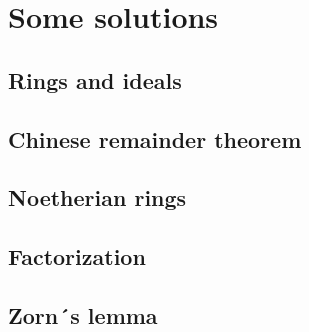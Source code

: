 \chapter{Some solutions}

\section*{Rings and ideals}
\section*{Chinese remainder theorem}
\section*{Noetherian rings}
\section*{Factorization}
\section*{Zorn´s lemma}